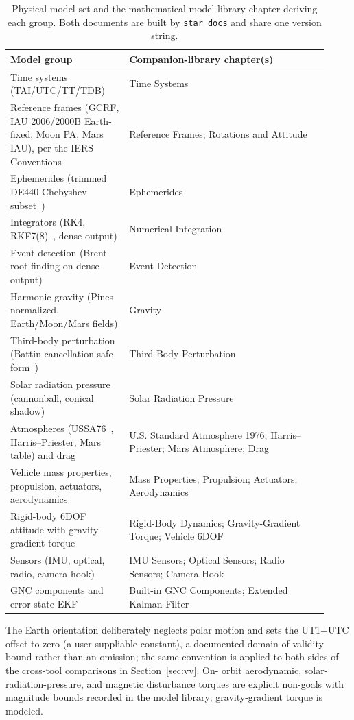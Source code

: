 \documentclass[10pt]{article}
\begin{document}
\begin{table}[htbp]
\centering
\caption{Physical-model set and the mathematical-model-library chapter deriving
  each group. Both documents are built by \texttt{star docs} and share one
  version string.}
\label{tab:models}
\small
\begin{tabular}{@{}p{0.34\linewidth}p{0.58\linewidth}@{}}
\toprule
Model group & Companion-library chapter(s) \\
\midrule
Time systems (TAI/UTC/TT/TDB) & Time Systems \\
Reference frames (GCRF, IAU 2006/2000B Earth-fixed, Moon PA, Mars IAU),
  per the IERS Conventions~\cite{iers2010} &
  Reference Frames; Rotations and Attitude \\
Ephemerides (trimmed DE440 Chebyshev subset~\cite{park2021}) & Ephemerides \\
Integrators (RK4, RKF7(8)~\cite{fehlberg1968,hairer1993}, dense output) &
  Numerical Integration \\
Event detection (Brent root-finding on dense output) & Event Detection \\
Harmonic gravity (Pines normalized, Earth/Moon/Mars fields) & Gravity \\
Third-body perturbation (Battin cancellation-safe form~\cite{battin1999}) &
  Third-Body Perturbation \\
Solar radiation pressure (cannonball, conical shadow) &
  Solar Radiation Pressure \\
Atmospheres (USSA76~\cite{ussa1976}, Harris--Priester, Mars table) and drag &
  U.S. Standard Atmosphere 1976; Harris--Priester; Mars Atmosphere; Drag \\
Vehicle mass properties, propulsion, actuators, aerodynamics &
  Mass Properties; Propulsion; Actuators; Aerodynamics \\
Rigid-body 6DOF attitude with gravity-gradient torque~\cite{markley2014} &
  Rigid-Body Dynamics; Gravity-Gradient Torque; Vehicle 6DOF \\
Sensors (IMU, optical, radio, camera hook)~\cite{titterton2004,groves2013} &
  IMU Sensors; Optical Sensors; Radio Sensors; Camera Hook \\
GNC components and error-state EKF~\cite{groves2013} &
  Built-in GNC Components; Extended Kalman Filter \\
\bottomrule
\end{tabular}
\end{table}

The Earth orientation deliberately neglects polar motion and sets the
UT1$-$UTC offset to zero (a user-suppliable constant), a documented
domain-of-validity bound rather than an omission; the same convention is
applied to both sides of the cross-tool comparisons in Section~\ref{sec:vv}. On-%
orbit aerodynamic, solar-radiation-pressure, and magnetic disturbance torques
are explicit non-goals with magnitude bounds recorded in the model library;
gravity-gradient torque is modeled.
\end{document}
